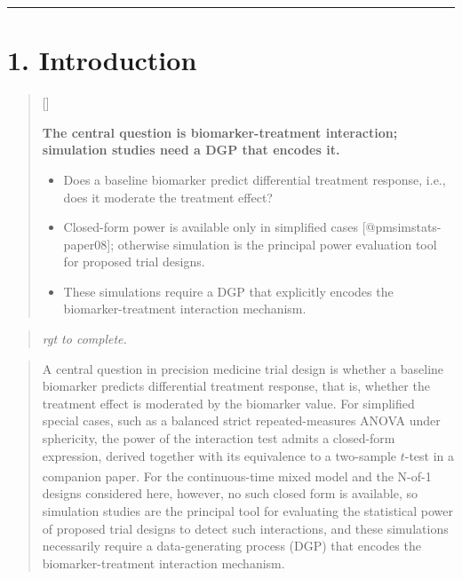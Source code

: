 \documentclass[
  11pt,
]{article}
\newcounter{pgraph}
\newenvironment{bullets}{%
  \stepcounter{pgraph}%
  \begin{quote}\small\sffamily\color[gray]{0.30}%
  {\normalfont\scriptsize\color[gray]{0.58}[\thepgraph]\enspace}}{%
  \end{quote}}
\newenvironment{rgt}{%
  \begin{quote}\small\itshape\color[RGB]{20,60,160}}{%
  \end{quote}}
\newenvironment{orig}{%
  \begin{quote}\normalsize\color[gray]{0.55}}{%
  \end{quote}}
\begin{document}
\rule{\textwidth}{0.4pt}\bigskip

\section{1. Introduction}

\begin{bullets}

\textbf{The central question is biomarker-treatment interaction;
simulation studies need a DGP that encodes it.}

\begin{itemize}\setlength{\itemsep}{2pt}\setlength{\parskip}{0pt}
\item Does a baseline biomarker predict differential treatment
  response, i.e., does it moderate the treatment effect?
\item Closed-form power is available only in simplified cases
  [@pmsimstats-paper08]; otherwise simulation is the principal power
  evaluation tool for proposed trial designs.
\item These simulations require a DGP that explicitly encodes
  the biomarker-treatment interaction mechanism.
\end{itemize}

\end{bullets}

\begin{rgt}
rgt to complete.

\end{rgt}

\begin{orig}
A central question in precision medicine trial design is whether a
baseline biomarker predicts differential treatment response, that is,
whether the treatment effect is moderated by the biomarker value. For
simplified special cases, such as a balanced strict repeated-measures
ANOVA under sphericity, the power of the interaction test admits a
closed-form expression, derived together with its equivalence to a
two-sample \(t\)-test in a companion
paper\textsuperscript{}. For the
continuous-time mixed model and the N-of-1 designs considered here,
however, no such closed form is available, so simulation studies are the
principal tool for evaluating the statistical power of proposed trial
designs to detect such interactions, and these simulations necessarily
require a data-generating process (DGP) that encodes the
biomarker-treatment interaction mechanism.

\end{orig}
\end{document}
